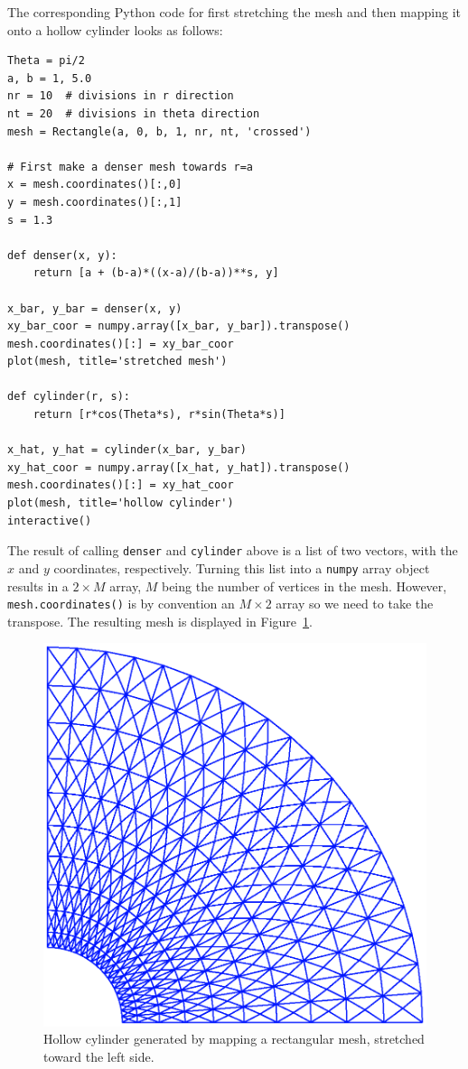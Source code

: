 The corresponding Python code for first stretching the mesh and
then mapping it onto a hollow cylinder looks as follows:
\begin{Verbatim}[fontsize=\fontsize{10pt}{10pt},tabsize=8,baselinestretch=1.05,
fontfamily=tt,xleftmargin=7mm]
Theta = pi/2
a, b = 1, 5.0
nr = 10  # divisions in r direction
nt = 20  # divisions in theta direction
mesh = Rectangle(a, 0, b, 1, nr, nt, 'crossed')

# First make a denser mesh towards r=a
x = mesh.coordinates()[:,0]
y = mesh.coordinates()[:,1]
s = 1.3

def denser(x, y):
    return [a + (b-a)*((x-a)/(b-a))**s, y]

x_bar, y_bar = denser(x, y)
xy_bar_coor = numpy.array([x_bar, y_bar]).transpose()
mesh.coordinates()[:] = xy_bar_coor
plot(mesh, title='stretched mesh')

def cylinder(r, s):
    return [r*cos(Theta*s), r*sin(Theta*s)]

x_hat, y_hat = cylinder(x_bar, y_bar)
xy_hat_coor = numpy.array([x_hat, y_hat]).transpose()
mesh.coordinates()[:] = xy_hat_coor
plot(mesh, title='hollow cylinder')
interactive()
\end{Verbatim}
\noindent
The result of calling {\fontsize{12pt}{12pt}\texttt{denser}} and {\fontsize{12pt}{12pt}\texttt{cylinder}} above is a list of two
vectors, with the $x$ and $y$ coordinates, respectively.
Turning this list into a {\fontsize{12pt}{12pt}\texttt{numpy}} array object results in a $2\times M$
array, $M$ being the number of vertices in the mesh. However,
{\fontsize{12pt}{12pt}\texttt{mesh.coordinates()}} is by convention an $M\times 2$ array so we
need to take the transpose. The resulting mesh is displayed
in Figure~\ref{langtangen:mesh:transform:cyl:fig1}.
\begin{figure}
  \centerline{
  {\includegraphics[width=0.9\linewidth]{chapters/langtangen/eps/hollow_cylinder.eps}}}
  \caption{\label{langtangen:mesh:transform:cyl:fig1}
  Hollow cylinder generated by mapping a rectangular mesh, stretched toward
  the left side.
  }
\end{figure}


